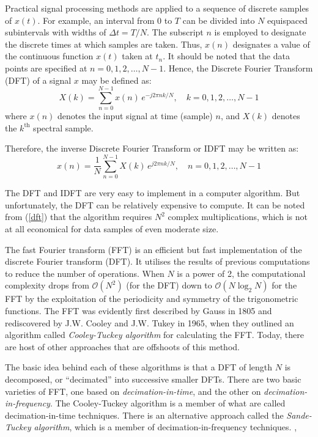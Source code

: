 \documentclass[a4paper,11pt]{report}
\begin{document}
Practical signal processing methods are applied to a sequence of discrete samples of $x(t)$. For example, an interval from 0 to $T$ can be divided into $N$ equispaced subintervals with widths of $\Delta t = T/N$. The subscript $n$ is employed to designate the discrete times at which samples are taken. Thus, $x(n)$ designates a value of the continuous function $x(t)$ taken at $t_{n}$. It should be noted that the data points are specified at $n=0,1,2,\ldots,N-1$. Hence, the Discrete Fourier Transform (DFT) of a signal $x$ may be defined as:
\begin{equation} \label{dft}
X(k) = \sum^{N-1}_{n=0} x(n)\,e^{-j2\pi n k/N}, \quad k=0,1,2,\ldots,N-1
\end{equation}
where $x(n)$ denotes the input signal at time (sample) $n$, and $X(k)$ denotes the $k^{\mathrm{th}}$ spectral sample.

Therefore, the inverse Discrete Fourier Transform or IDFT may be written as:
\begin{equation}
x(n) = \frac{1}{N} \sum^{N-1}_{n=0} X(k)\,e^{j2\pi n k/N}, \quad n=0,1,2,\ldots,N-1
\end{equation}

The DFT and IDFT are very easy to implement in a computer algorithm. But unfortunately, the DFT can be relatively expensive to compute. It can be noted from (\ref{dft}) that the algorithm requires $N^{2}$ complex multiplications, which is not at all economical for data samples of even moderate size. 

The fast Fourier transform (FFT) is an efficient but fast implementation of the discrete Fourier transform (DFT). It utilises the results of previous computations to reduce the number of operations. When $N$ is a power of 2, the computational complexity drops from ${\mathcal O}(N^2)$ (for the DFT) down to ${\mathcal O}(N\log_{2} N)$ for the FFT by the exploitation of the periodicity and symmetry of the trigonometric functions. The FFT was evidently first described by Gauss in 1805 and rediscovered by J.W. Cooley and J.W. Tukey in 1965, when they outlined an algorithm called \emph{Cooley-Tuckey algorithm} for calculating the FFT. Today, there are host of other approaches that are offshoots of this method. \cite{schilling}

The basic idea behind each of these algorithms is that a DFT of length $N$ is decomposed, or ``decimated'' into successive smaller DFTs. There are two basic varieties of FFT, one based on \emph{decimation-in-time}, and the other on \emph{decimation-in-frequency}. The Cooley-Tuckey algorithm is a member of what are called decimation-in-time techniques. There is an alternative approach called the \emph{Sande-Tuckey algorithm}, which is a member of decimation-in-frequency techniques. \cite{chapra},\cite{nric}
\end{document}
